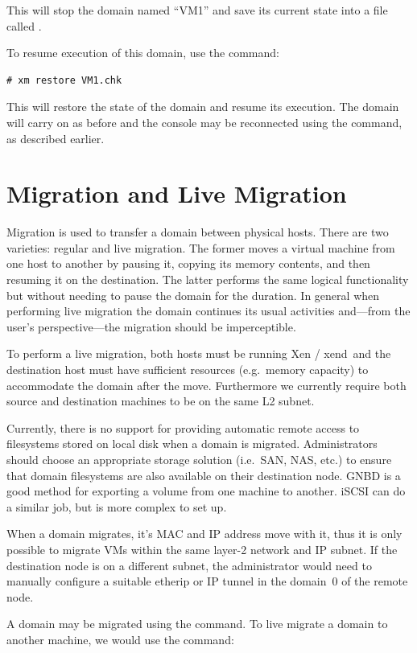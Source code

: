 \documentclass[11pt,twoside,final,openright]{report}
\def\xend{{xend}\xspace}
\begin{document}
This will stop the domain named ``VM1'' and save its current state
into a file called .

To resume execution of this domain, use the  command:
\begin{verbatim}
# xm restore VM1.chk
\end{verbatim}

This will restore the state of the domain and resume its execution.
The domain will carry on as before and the console may be reconnected
using the  command, as described earlier.

\section{Migration and Live Migration}

Migration is used to transfer a domain between physical hosts. There
are two varieties: regular and live migration. The former moves a
virtual machine from one host to another by pausing it, copying its
memory contents, and then resuming it on the destination. The latter
performs the same logical functionality but without needing to pause
the domain for the duration. In general when performing live migration
the domain continues its usual activities and---from the user's
perspective---the migration should be imperceptible.

To perform a live migration, both hosts must be running Xen / \xend\ and
the destination host must have sufficient resources (e.g.\ memory
capacity) to accommodate the domain after the move. Furthermore we
currently require both source and destination machines to be on the same
L2 subnet.

Currently, there is no support for providing automatic remote access
to filesystems stored on local disk when a domain is migrated.
Administrators should choose an appropriate storage solution (i.e.\
SAN, NAS, etc.) to ensure that domain filesystems are also available
on their destination node. GNBD is a good method for exporting a
volume from one machine to another. iSCSI can do a similar job, but is
more complex to set up.

When a domain migrates, it's MAC and IP address move with it, thus it is
only possible to migrate VMs within the same layer-2 network and IP
subnet. If the destination node is on a different subnet, the
administrator would need to manually configure a suitable etherip or IP
tunnel in the domain~0 of the remote node.

A domain may be migrated using the  command. To live
migrate a domain to another machine, we would use the command:
\end{document}
